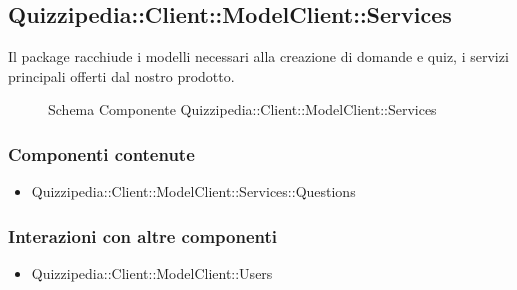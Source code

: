 \subsection{Quizzipedia::Client::ModelClient::Services}
Il package racchiude i modelli necessari alla creazione di domande e quiz, i servizi principali offerti dal nostro prodotto.
\begin{figure}[H]
\centering
\noindent{}
\caption[Quizzipedia::Client::ModelClient::Services]{Schema Componente Quizzipedia::Client::ModelClient::Services}
\end{figure}
\subsubsection{Componenti contenute}
\begin{itemize}
\item Quizzipedia::Client::ModelClient::Services::Questions
\end{itemize}
\subsubsection{Interazioni con altre componenti}
\begin{itemize}
\item Quizzipedia::Client::ModelClient::Users
\end{itemize}
